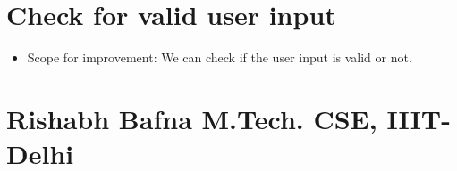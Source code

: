 \documentclass[11pt]{article}
\makeatletter
\providecommand{\tightlist}{%
      \setlength{\itemsep}{0pt}\setlength{\parskip}{0pt}}
\newcommand{\boxspacing}{\kern\kvtcb@left@rule\kern\kvtcb@boxsep}
\newcommand{\prompt}[4]{
        {\ttfamily\llap{{\color{#2}[#3]:\hspace{3pt}#4}}\vspace{-\baselineskip}}
    }
\makeatother
\begin{document}
    \hypertarget{check-for-valid-user-input}{%
\section{Check for valid user input}\label{check-for-valid-user-input}}

\begin{itemize}
\tightlist
\item
  Scope for improvement: We can check if the user input is valid or not.
\end{itemize}

    \hypertarget{rishabh-bafna-m.tech.-cse-iiit-delhi}{%
\section{Rishabh Bafna \textbar{} M.Tech. CSE,
IIIT-Delhi}\label{rishabh-bafna-m.tech.-cse-iiit-delhi}}

    \begin{tcolorbox}[breakable, size=fbox, boxrule=1pt, pad at break*=1mm,colback=cellbackground, colframe=cellborder]
\prompt{In}{incolor}{ }{\boxspacing}
\begin{Verbatim}[commandchars=\\\{\}]

\end{Verbatim}
\end{tcolorbox}


    
    
    
\end{document}
